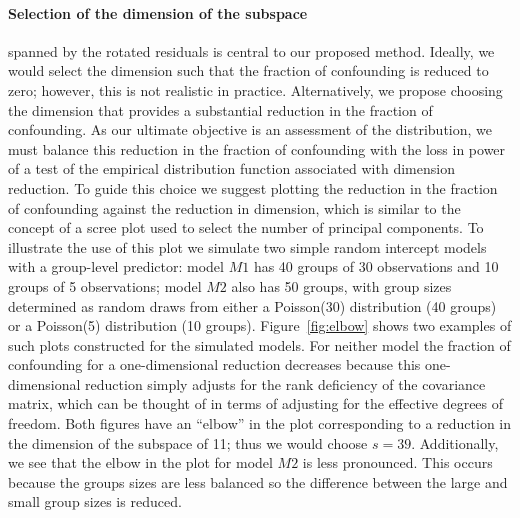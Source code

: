\documentclass[12pt]{article} %
\newcommand{\hh}[1]{{\color{orange} #1}}
\begin{document}
{\paragraph{Selection of the dimension of the subspace}
 spanned by the rotated residuals is central to our proposed method. Ideally, we would select the dimension such that the fraction of confounding is reduced to zero; however, this is not realistic in practice. Alternatively, we propose choosing the dimension that provides a substantial reduction in the fraction of confounding. As our ultimate objective is an assessment of the distribution, we must balance this reduction in the fraction of confounding with the loss in power of a test of the empirical distribution function %
 associated with dimension reduction. To guide this choice we suggest plotting the reduction in the fraction of confounding against the reduction in dimension, which is similar to the concept of a scree plot used to select the number of principal components. %
 To illustrate the use of this plot we simulate two simple random intercept models with a group-level predictor:   model $M1$ has 40 groups of 30 observations and 10 groups of 5 observations;   model $M2$ also has 50 groups, with group sizes determined as random draws from either a Poisson(30) distribution (40 groups) or a Poisson(5) distribution (10 groups). %
 Figure~\ref{fig:elbow} shows two examples of such plots constructed for the simulated models. For neither model the fraction of confounding for a one-dimensional reduction decreases because this {one-dimensional reduction} simply adjusts for the rank deficiency of the covariance matrix, which can be thought of in terms of adjusting for the effective degrees of freedom. Both figures have an ``elbow'' in the plot corresponding to a reduction in the dimension of the subspace of 11; thus we would choose $s = 39$. { Additionally, we see that the elbow in the plot for model $M2$ is less pronounced. This occurs because the groups sizes are less balanced so the difference between the large and small group sizes is reduced.}
 
}
\end{document}
